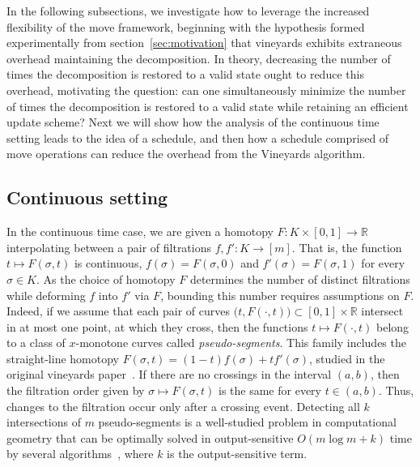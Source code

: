 \documentclass[sn-mathphys]{sn-jnl}
\begin{document}
In the following subsections, we investigate how to  leverage the increased flexibility of the move framework, beginning with the hypothesis formed experimentally from section~\ref{sec:motivation} that vineyards exhibits extraneous overhead maintaining the decomposition.
In theory, decreasing the number of times the decomposition is restored to a valid state ought to reduce this overhead, motivating the question: can one simultaneously minimize the number of times the decomposition is restored to a valid state while retaining an efficient update scheme? 
Next we will show how the analysis of the 
continuous time setting leads to the idea of a schedule, 
and then how a schedule comprised of move operations 
can reduce the overhead from the Vineyards algorithm. 

\subsection{Continuous setting}\label{sec:continuous_setting}
In the continuous time case, we are given a homotopy $F : K \times [0,1] \to \mathbb{R}$ interpolating between  a pair of filtrations $f,f' : K \rightarrow [m]$. That is,  the function $t\mapsto F(\sigma, t)$ is continuous,  $f(\sigma) = F(\sigma, 0)$ and $f'(\sigma) = F(\sigma, 1)$ for every  $\sigma \in K$. 
As the choice of homotopy $F$ determines the number of distinct filtrations while deforming $f$ into $f'$ via $F$, bounding this number requires assumptions on $F$. 
Indeed, if we assume that each pair of curves $\big(t,  F(\cdot, t)\big) \subset [0,1]\times \mathbb{R}$  intersect in at most one point, at which they cross, then the  functions $t\mapsto F(\cdot, t)$ belong to a class of $x$-monotone curves called \emph{pseudo-segments}.
This family includes the straight-line homotopy $F(\sigma, t) = (1 - t) f(\sigma) + t f'(\sigma)$,  studied in the original vineyards paper~\cite{cohen2006vines}. 
If there are no crossings in the interval $(a,b)$,
then the filtration order given by $\sigma \mapsto F(\sigma, t)$
is the same for every $t\in (a,b)$.
Thus, changes to the filtration occur only after a crossing event. 
Detecting all $k$ intersections of $m$ pseudo-segments is a well-studied problem in computational geometry that can be optimally solved in output-sensitive $O(m \log m + k)$ time by several algorithms~\cite{boissonnat2000efficient}, where $k$ is the output-sensitive term. 
\end{document}

